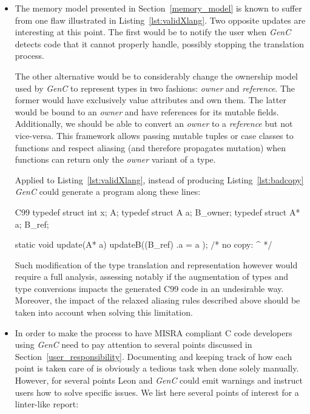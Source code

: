 \documentclass[a4paper,twoside]{article}
\newcommand{\GenC}{\emph{GenC}\xspace}
\newcommand{\RefSec}[1]{Section~\ref{#1}}
\newcommand{\RefCode}[1]{Listing~\ref{#1}}
\begin{document}
\begin{itemize}
\begin{ShortCode}{Leon}
def foo(x: MutableType) = {
  val y = x // Currently illegal but planned to be valid
  bar(y)    // as x is not used after y is created.
}
\end{ShortCode}

Such modification of the anti-aliasing rules would require a reassessment of how
\GenC handle mutability to determine whether the translation process remains
sound.

\item The memory model presented in \RefSec{memory_model} is known to suffer
from one flaw illustrated in \RefCode{lst:validXlang}. Two opposite updates are
interesting at this point. The first would be to notify the user when \GenC
detects code that it cannot properly handle, possibly stopping the translation
process.

The other alternative would be to considerably change the ownership model used
by \GenC to represent types in two fashions: \emph{owner} and \emph{reference}.
The former would have exclusively value attributes and own them. The latter
would be bound to an \emph{owner} and have references for its mutable fields.
Additionally, we should be able to convert an \emph{owner} to a \emph{reference}
but not vice-versa. This framework allows passing mutable tuples or case classes
to functions and respect aliasing (and therefore propagates mutation) when
functions can return only the \emph{owner} variant of a type.

Applied to \RefCode{lst:validXlang}, instead of producing \RefCode{lst:badcopy}
\GenC could generate a program along these lines:

\begin{ShortCode}{C99}
typedef struct { int x; } A;
typedef struct { A   a; } B_owner;
typedef struct { A*  a; } B_ref;

static void update(A* a) {
  updateB((B_ref) { .a = a });
  /* no copy:            ^  */
}
\end{ShortCode}

Such modification of the type translation and representation however would
require a full analysis, assessing notably if the augmentation of types and type
conversions impacts the generated C99 code in an undesirable way. Moreover, the
impact of the relaxed aliasing rules described above should be taken into
account when solving this limitation.

\item In order to make the process to have MISRA compliant C code developers
using \GenC need to pay attention to several points discussed in
\RefSec{user_responsibility}. Documenting and keeping track of how each point is
taken care of is obviously a tedious task when done solely manually. However,
for several points Leon and \GenC could emit warnings and instruct users how to
solve specific issues. We list here several points of interest for a linter-like
report:


\end{itemize}
\end{document}
